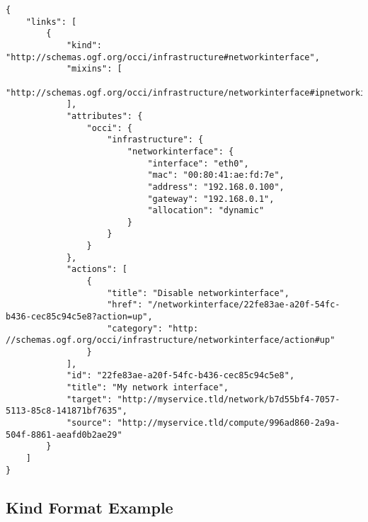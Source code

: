 \documentclass[10pt,a4paper]{article}
\begin{document}
\begin{verbatim}
{
    "links": [
        {
            "kind": "http://schemas.ogf.org/occi/infrastructure#networkinterface",
            "mixins": [
                "http://schemas.ogf.org/occi/infrastructure/networkinterface#ipnetworkinterface"
            ],
            "attributes": {
                "occi": {
                    "infrastructure": {
                        "networkinterface": {
                            "interface": "eth0",
                            "mac": "00:80:41:ae:fd:7e",
                            "address": "192.168.0.100",
                            "gateway": "192.168.0.1",
                            "allocation": "dynamic"
                        }
                    }
                }
            },
            "actions": [
                {
                    "title": "Disable networkinterface",
                    "href": "/networkinterface/22fe83ae-a20f-54fc-b436-cec85c94c5e8?action=up",
                    "category": "http: //schemas.ogf.org/occi/infrastructure/networkinterface/action#up"
                }
            ],
            "id": "22fe83ae-a20f-54fc-b436-cec85c94c5e8",
		    "title": "My network interface",
            "target": "http://myservice.tld/network/b7d55bf4-7057-5113-85c8-141871bf7635",
            "source": "http://myservice.tld/compute/996ad860-2a9a-504f-8861-aeafd0b2ae29"
        }
    ]
}
\end{verbatim}

\subsection{Kind Format Example}
\label{sec:example_kind}
\end{document}
